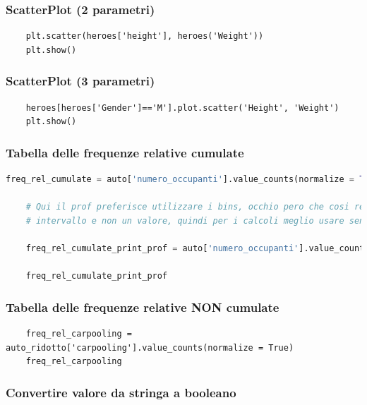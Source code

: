 \documentclass{article}
\begin{document}
\subsubsection*{ScatterPlot (2 parametri)}

\begin{lstlisting}
    plt.scatter(heroes['height'], heroes('Weight'))
    plt.show()
\end{lstlisting}

\subsubsection*{ScatterPlot (3 parametri)}

\begin{lstlisting}
    heroes[heroes['Gender']=='M'].plot.scatter('Height', 'Weight')
    plt.show()
\end{lstlisting}

\subsubsection*{Tabella delle frequenze relative cumulate}

\begin{lstlisting}[language=Python]
    freq_rel_cumulate = auto['numero_occupanti'].value_counts(normalize = True).sort_index().cumsum()

    # Qui il prof preferisce utilizzare i bins, occhio pero che cosi restituisce un 
    # intervallo e non un valore, quindi per i calcoli meglio usare senza bins

    freq_rel_cumulate_print_prof = auto['numero_occupanti'].value_counts(normalize = True, bins = 10).sort_index().cumsum()

    freq_rel_cumulate_print_prof
\end{lstlisting}

\subsubsection*{Tabella delle frequenze relative NON cumulate}

\begin{lstlisting}
    freq_rel_carpooling = auto_ridotto['carpooling'].value_counts(normalize = True)
    freq_rel_carpooling
\end{lstlisting}

\subsubsection*{Convertire valore da stringa a booleano}
\end{document}

